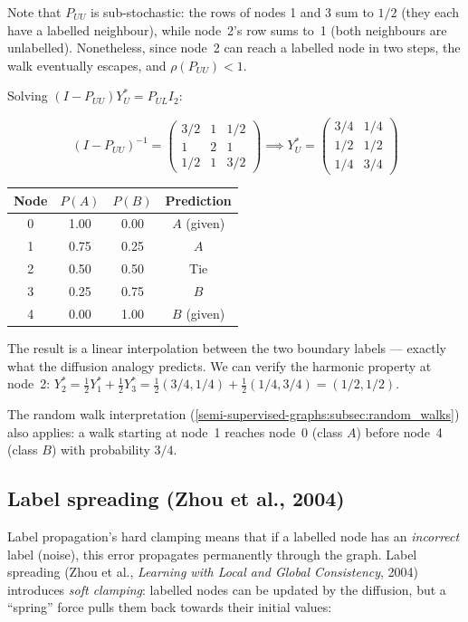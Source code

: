 \begin{notechapter}
\begin{example}
\noindent Note that $P_{UU}$ is sub-stochastic: the rows of nodes 1 and 3 sum
to $1/2$ (they each have a labelled neighbour), while node~2's row sums to~1
(both neighbours are unlabelled). Nonetheless, since node~2 can reach a labelled
node in two steps, the walk eventually escapes, and $\rho(P_{UU}) < 1$.

Solving $(I - P_{UU})Y_U^* = P_{UL}I_2$:

\[
(I - P_{UU})^{-1} = \begin{pmatrix}
3/2 & 1 & 1/2 \\ 1 & 2 & 1 \\ 1/2 & 1 & 3/2
\end{pmatrix} \implies
Y_U^* = \begin{pmatrix} 3/4 & 1/4 \\ 1/2 & 1/2 \\ 1/4 & 3/4 \end{pmatrix}
\]

\begin{center}
\begin{tabular}{c|cc|c}
\toprule Node & $P(A)$ & $P(B)$ & Prediction \\ \midrule
0 & 1.00 & 0.00 & $A$ (given) \\
1 & 0.75 & 0.25 & $A$ \\
2 & 0.50 & 0.50 & Tie \\
3 & 0.25 & 0.75 & $B$ \\
4 & 0.00 & 1.00 & $B$ (given) \\ \bottomrule
\end{tabular}
\end{center}

The result is a linear interpolation between the two boundary labels --- exactly
what the diffusion analogy predicts. We can verify the harmonic property at
node~2: $Y_2^* = \frac{1}{2}Y_1^* + \frac{1}{2}Y_3^*
= \frac{1}{2}(3/4,1/4) + \frac{1}{2}(1/4,3/4) = (1/2,1/2)$.

The random walk interpretation (\cref{semi-supervised-graphs:subsec:random_walks}) also
applies: a walk starting at node~1 reaches node~0 (class $A$) before node~4
(class $B$) with probability $3/4$.
\end{example}

\subsection{Label spreading (Zhou et al., 2004)}
\label{semi-supervised-graphs:subsec:ls}

Label propagation's hard clamping means that if a labelled node has an
\emph{incorrect} label (noise), this error propagates permanently through the
graph. Label spreading (Zhou et al., \emph{Learning with Local and Global Consistency}, 2004) introduces \emph{soft clamping}:
labelled nodes can be updated by the diffusion, but a ``spring'' force pulls
them back towards their initial values:


\end{notechapter}
